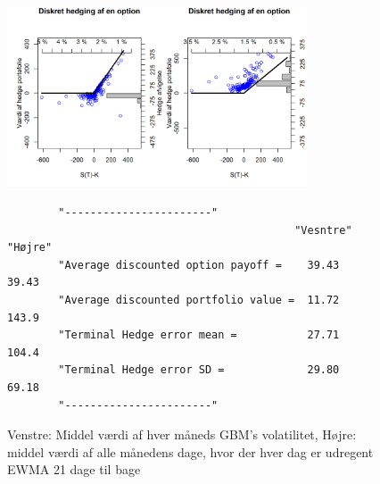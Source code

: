 \documentclass{article}
\theoremstyle{definition}
\theoremstyle{remark}
\begin{document}
\begin{figure}
    \centering
    \includegraphics[width=3.5in]{Overleaf/option_call_monthlyGBM_monthlyVIX100EWMA}
    \caption{Venstre: Middel værdi af hver måneds GBM's volatilitet, Højre: middel værdi af alle månedens dage, hvor der hver dag er udregent EWMA 21 dage til bage}
    \begin{verbatim}
        "-----------------------"                         
                                             "Vesntre"       "Højre"
        "Average discounted option payoff =    39.43          39.43
        "Average discounted portfolio value =  11.72          143.9
        "Terminal Hedge error mean =           27.71          104.4
        "Terminal Hedge error SD =             29.80          69.18
        "-----------------------"
    \end{verbatim}
    \label{fig:monthGBM}
\end{figure}
\end{document}
